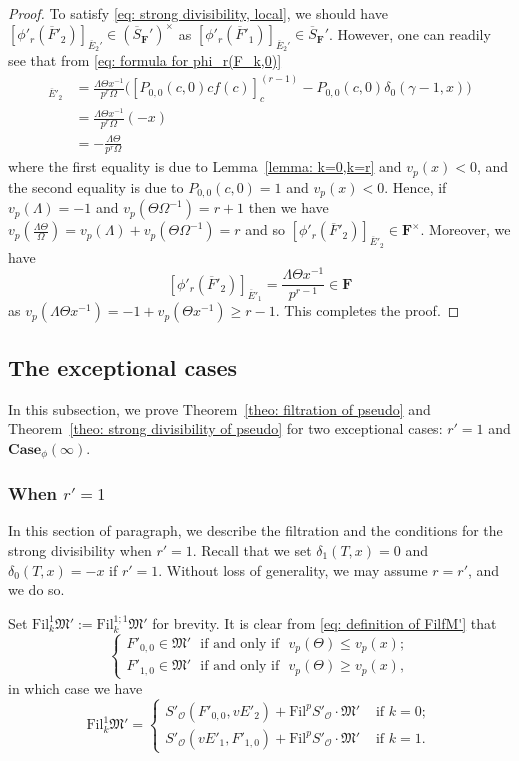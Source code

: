 \documentclass[11pt]{amsart}
\theoremstyle{definition}
\numberwithin{equation}{subsection}
\theoremstyle{plain}
\theoremstyle{plain}
\theoremstyle{plain}
\theoremstyle{plain}
\theoremstyle{plain}
\theoremstyle{plain}
\theoremstyle{plain}
\theoremstyle{plain}
\theoremstyle{plain}
\theoremstyle{plain}
\theoremstyle{plain}
\theoremstyle{plain}
\theoremstyle{definition}
\theoremstyle{definition}
\theoremstyle{definition}
\theoremstyle{remark}
\renewcommand{\(}{\textup{(}}
\renewcommand{\)}{\textup{)}}
\newcommand{\F}{\mathbf{F}}
\newcommand{\barS}{\overline{S}}
\newcommand{\fM}{\mathfrak{M}}
\newcommand{\Fil}{\mathrm{Fil}}
\newcommand{\cO}{\mathcal{O}}
\newcommand{\barE}{\overline{E}}
\newcommand{\barF}{\overline{F}}
\begin{document}
\begin{proof}
To satisfy \eqref{eq: strong divisibility, local}, we should have $[\phi'_r(\barF'_2)]_{\barE_2'}\in (\barS_\F')^\times$ as $[\phi'_r(\barF'_1)]_{\barE_2'}\in \barS_\F'$. However, one can readily see that from \eqref{eq: formula for phi_r(F_k,0)}
\begin{align*}
[\phi'_r(\barF'_2)]_{\barE'_2}& =\frac{\Lambda\Theta x^{-1}}{p^{r}\Omega}\big([P_{0,0}(c,0)cf(c)]_c^{(r-1)}-P_{0,0}(c,0)\delta_0(\gamma-1,x)\big)\\
&=\frac{\Lambda\Theta x^{-1}}{p^{r}\Omega}(-x)\\
&=-\frac{\Lambda\Theta}{p^r\Omega}
\end{align*}
where the first equality is due to Lemma~\ref{lemma: k=0,k=r} and $v_p(x)<0$, and the second equality is due to $P_{0,0}(c,0)=1$ and $v_p(x)<0$. Hence, if $v_p(\Lambda)=-1$ and $v_p(\Theta\Omega^{-1})=r+1$ then we have $v_p(\frac{\Lambda\Theta}{\Omega})=v_p(\Lambda)+v_p(\Theta\Omega^{-1})=r$ and so $[\phi'_r(\barF'_2)]_{\barE'_2}\in\F^{\times}$. Moreover, we have $$[\phi'_r(\barF'_2)]_{\barE'_1}= \frac{\Lambda \Theta x^{-1}}{p^{r-1}}\in\F$$ as $v_p(\Lambda\Theta x^{-1})=-1+v_p(\Theta x^{-1})\geq r-1$. This completes the proof.
\end{proof}


\subsection{The exceptional cases}\label{subsec: exceptional cases}
In this subsection, we prove Theorem~\ref{theo: filtration of pseudo} and Theorem~\ref{theo: strong divisibility of pseudo} for two exceptional cases: $r'=1$ and $\mathbf{Case}_\phi(\infty)$.

\subsubsection{\textbf{When $r'=1$}}
In this section of paragraph, we describe the filtration and the conditions for the strong divisibility when $r'=1$. Recall that we set $\delta_1(T,x)=0$ and $\delta_0(T,x)=-x$ if $r'=1$. Without loss of generality, we may assume $r=r'$, and we do so.

Set $\Fil^1_{k}\fM':=\Fil^{1;1}_{k}\fM'$ for brevity. It is clear from \eqref{eq: definition of FilfM'} that
\begin{equation}\label{eq: condition for filtration, r=1}
\begin{cases}
F'_{0,0}\in\fM'\,\,\mbox{ if and only if }\,\,v_p(\Theta)\leq v_p(x);\\
F'_{1,0}\in\fM'\,\,\mbox{ if and only if }\,\,v_p(\Theta)\geq v_p(x),
\end{cases}
\end{equation}
in which case we have
\begin{equation}\label{eq: generators of the filtration, r=1}
\Fil^{1}_{k}\fM'=
\begin{cases}
S'_\cO(F'_{0,0},vE'_2)+\Fil^pS'_\cO\cdot\fM'&\mbox{ if }k=0;\\
S'_\cO(vE'_1,F'_{1,0})+\Fil^pS'_\cO\cdot\fM'&\mbox{ if }k=1.
\end{cases}
\end{equation}
\end{document}
